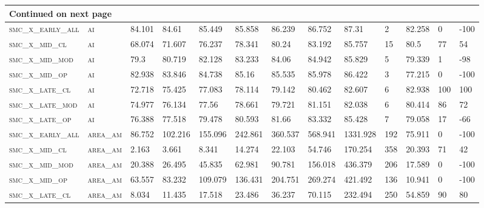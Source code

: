 \begin{landscape}
\begin{center}
\begin{footnotesize}
\begin{longtable}{lllllllllllll}
\hline \multicolumn{13}{|l|}{{Continued on next page}} \\ \hline
\endfoot

\hline \hline
\endlastfoot

\textsc{smc\_x\_early\_all} & \textsc{ai        }   & 84.101   & 84.61    & 85.449   & 85.858   & 86.239   & 86.752   & 87.31    & 2   & 82.258   & 0   & -100   \\
\textsc{smc\_x\_mid\_cl   } & \textsc{ai        }   & 68.074   & 71.607   & 76.237   & 78.341   & 80.24    & 83.192   & 85.757   & 15  & 80.5     & 77  & 54     \\
\textsc{smc\_x\_mid\_mod  } & \textsc{ai        }   & 79.3     & 80.719   & 82.128   & 83.233   & 84.06    & 84.942   & 85.829   & 5   & 79.339   & 1   & -98    \\
\textsc{smc\_x\_mid\_op   } & \textsc{ai        }   & 82.938   & 83.846   & 84.738   & 85.16    & 85.535   & 85.978   & 86.422   & 3   & 77.215   & 0   & -100   \\
\textsc{smc\_x\_late\_cl  } & \textsc{ai        }   & 72.718   & 75.425   & 77.083   & 78.114   & 79.142   & 80.462   & 82.607   & 6   & 82.938   & 100 & 100    \\
\textsc{smc\_x\_late\_mod } & \textsc{ai        }   & 74.977   & 76.134   & 77.56    & 78.661   & 79.721   & 81.151   & 82.038   & 6   & 80.414   & 86  & 72     \\
\textsc{smc\_x\_late\_op  } & \textsc{ai        }   & 76.388   & 77.518   & 79.478   & 80.593   & 81.66    & 83.332   & 85.428   & 7   & 79.058   & 17  & -66    \\
\textsc{smc\_x\_early\_all} & \textsc{area\_am  }   & 86.752   & 102.216  & 155.096  & 242.861  & 360.537  & 568.941  & 1331.928 & 192 & 75.911   & 0   & -100   \\
\textsc{smc\_x\_mid\_cl   } & \textsc{area\_am  }   & 2.163    & 3.661    & 8.341    & 14.274   & 22.103   & 54.746   & 170.254  & 358 & 20.393   & 71  & 42     \\
\textsc{smc\_x\_mid\_mod  } & \textsc{area\_am  }   & 20.388   & 26.495   & 45.835   & 62.981   & 90.781   & 156.018  & 436.379  & 206 & 17.589   & 0   & -100   \\
\textsc{smc\_x\_mid\_op   } & \textsc{area\_am  }   & 63.557   & 83.232   & 109.079  & 136.431  & 204.751  & 269.274  & 421.492  & 136 & 10.941   & 0   & -100   \\
\textsc{smc\_x\_late\_cl  } & \textsc{area\_am  }   & 8.034    & 11.435   & 17.518   & 23.486   & 36.237   & 70.115   & 232.494  & 250 & 54.859   & 90  & 80     \\

\end{longtable}
\end{footnotesize}
\end{center}
\end{landscape}
